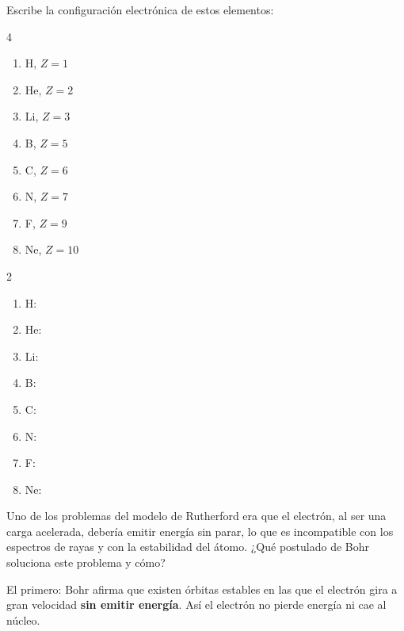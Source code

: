 \begin{exercise}
    Escribe la configuración electrónica de estos elementos:
    \begin{multicols}{4}
        \begin{enumerate}[label=\alph*)]
            \item H, \(Z = 1\)
            \item He, \(Z = 2\)
            \item Li, \(Z = 3\)
            \item B, \(Z = 5\)
            \item C, \(Z = 6\)
            \item N, \(Z = 7\)
            \item F, \(Z = 9\)
            \item Ne, \(Z = 10\)
        \end{enumerate}
    \end{multicols}
    \begin{solu}
        \begin{multicols}{2}
            \begin{enumerate}[label=\alph*)]
                \item H: 
                \item He: 
                \item Li: 
                \item B: 
                \item C: 
                \item N: 
                \item F: 
                \item Ne: 
            \end{enumerate}
        \end{multicols}
    \end{solu}
\end{exercise}

\begin{exercise}
    Uno de los problemas del modelo de Rutherford era que el electrón, al ser una carga acelerada, debería emitir energía sin parar, lo que es incompatible con los espectros de rayas y con la estabilidad del átomo. ¿Qué postulado de Bohr soluciona este problema y cómo?
    \begin{solu}
        El primero: Bohr afirma que existen órbitas estables en las que el electrón gira a gran velocidad \textbf{sin emitir energía}. Así el electrón no pierde energía ni cae al núcleo.
    \end{solu}
\end{exercise}

